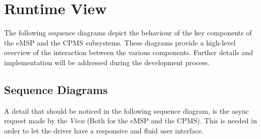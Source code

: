 \section{Runtime View}
\label{sec:runtimeView}
The following sequence diagrams depict the behaviour of the key components of the eMSP and the CPMS subsystems. These diagrams provide a high-level overview of the interaction between the various components. Further details and implementation will be addressed during the development process.
\subsection{Sequence Diagrams}
\label{subsec:sequenceDiagrams}
A detail that should be noticed in the following sequence diagram, is the async request made by the \textit{View} (Both for the eMSP and the CPMS). This is needed in order to let the driver have a responsive and fluid user interface. 
